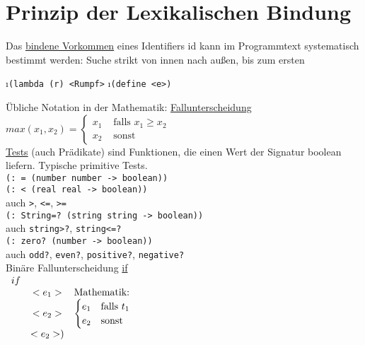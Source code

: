 \section*{Prinzip der Lexikalischen Bindung}
Das \underline{bindene Vorkommen} eines Identifiers id kann im Programmtext systematisch bestimmt werden: Suche strikt von innen nach au\ss en, bis zum ersten
\begin{enumerate}[(1)]
\i \lstinline!(lambda (r) <Rumpf>!
\i \lstinline!(define <e>)!
\end{enumerate}
\"Ubliche Notation in der Mathematik: \uline{Fallunterscheidung}\\
$max(x_1,x_2) =
\begin{cases}
x_1 &\text{ falls } x_1 \geq x_2\\
x_2 &\text{ sonst } 
\end{cases}$\\
\underline{Tests} (auch Pr\"adikate) sind Funktionen, die einen Wert der Signatur boolean liefern. Typische primitive Tests.\\
\lstinline!(: = (number number -> boolean))!\\
\lstinline!(: < (real real -> boolean))!\\
auch \lstinline!>!, \lstinline!<=!, \lstinline!>=!\\
\lstinline!(: String=? (string string -> boolean))!\\
auch \lstinline!string>?!, \lstinline!string<=?!\\
\lstinline!(: zero? (number -> boolean))!\\
auch \lstinline!odd?!, \lstinline!even?!, \lstinline!positive?!, \lstinline!negative?!\\
Bin\"are Fallunterscheidung \underline{if}\\
$\begin{array}{lcl}
if\\
& <e_1>& \text{Mathematik:}\\
& <e_2>& \begin{cases}e_1& \text{falls } t_1\\
					  e_2& \text{sonst}
\end{cases}\\
& <e_2>)
\end{array}$


